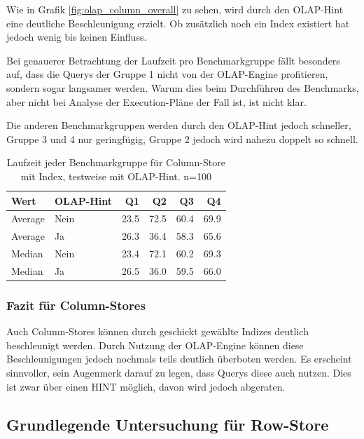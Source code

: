 Wie in Grafik \ref{fig:olap_column_overall} zu sehen, wird durch den OLAP-Hint eine deutliche Beschleunigung erzielt. Ob zusätzlich noch ein Index existiert hat jedoch wenig bis keinen Einfluss.

Bei genauerer Betrachtung der Laufzeit pro Benchmarkgruppe fällt besonders auf, dass die Querys der Gruppe 1 nicht von der OLAP-Engine profitieren, sondern sogar langsamer werden. 
Warum dies beim Durchführen des Benchmarks, aber nicht bei Analyse der Execution-Pläne der Fall ist, ist nicht klar.

Die anderen Benchmarkgruppen werden durch den OLAP-Hint jedoch schneller, Gruppe 3 und 4 nur geringfügig, Gruppe 2 jedoch wird nahezu doppelt so schnell.
\begin{table}[H]
    \centering
    \begin{tabularx}{\linewidth}{lXrrrr}
    \toprule
	Wert        &	OLAP-Hint & Q1 	    &	Q2 	    &	Q3	    &	Q4 \\
    \toprule
    Average	    & Nein        &	23.5	&	72.5	&	60.4	&	69.9 \\
    Average     & Ja	      &	26.3	&	36.4	&	58.3	&	65.6 \\
    \midrule
    Median	    & Nein        &	23.4	&	72.1	&	60.2	&	69.3 \\
    Median	    & Ja          &	26.5	&	36.0	&	59.5	&	66.0 \\
    \bottomrule
    \end{tabularx}
	\caption{Laufzeit jeder Benchmarkgruppe für Column-Store mit Index, testweise mit OLAP-Hint. n=100}
    \label{tab:olap_bench}
\end{table}

\subsubsection{Fazit für Column-Stores}
Auch Column-Stores können durch geschickt gewählte Indizes deutlich beschleunigt werden. Durch Nutzung der OLAP-Engine können diese Beschleunigungen jedoch nochmals teils deutlich überboten werden. 
Es erscheint sinnvoller, sein Augenmerk darauf zu legen, dass Querys diese auch nutzen. Dies ist zwar über einen HINT möglich, davon wird jedoch abgeraten.

\subsection{Grundlegende Untersuchung für Row-Store}

